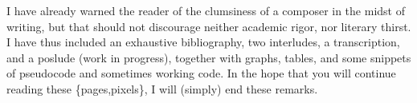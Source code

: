 I have already warned the reader of the clumsiness of a composer in the midst of writing, but that should not discourage neither academic rigor, nor literary thirst. I have thus included an exhaustive bibliography, two interludes, a transcription, and a poslude (work in progress), together with graphs, tables, and some snippets of pseudocode and sometimes working code. In the hope that you will continue reading these \{pages,pixels\}, I will (simply)  end  these remarks.
